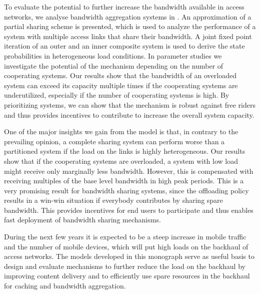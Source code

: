 To evaluate the potential to further increase the bandwidth available in access networks, we analyse bandwidth aggregation systems in .
An approximation of a partial sharing scheme is presented, which is used to analyze the performance of a system with multiple access links that share their bandwidth.
A joint fixed point iteration of an outer and an inner composite system is used to derive the state probabilities in heterogeneous load conditions.
In parameter studies we investigate the potential of the mechanism depending on the number of cooperating systems.
Our results show that the bandwidth of an overloaded system can exceed its capacity multiple times if the cooperating systems are underutilized, especially if the number of cooperating systems is high.
By prioritizing systems, we can show that the mechanism is robust against free riders and thus provides incentives to contribute to increase the overall system capacity.

One of the major insights we gain from the model is that, in contrary to the prevailing opinion, a complete sharing system can perform worse than a partitioned system if the load on the links is highly heterogeneous.
Our results show that if the cooperating systems are overloaded, a system with low load might receive only marginally less bandwidth.
However, this is compensated with receiving multiples of the base level bandwidth in high peak periods.
This is a very promising result for bandwidth sharing systems, since the offloading policy results in a win-win situation if everybody contributes by sharing spare bandwidth.
This provides incentives for end users to participate and thus enables fast deployment of bandwidth sharing mechanisms.

During the next few years it is expected to be a steep increase in mobile traffic and the number of mobile devices, which will put high loads on the backhaul of access networks.
The models developed in this monograph serve as useful basis to design and evaluate mechanisms to further reduce the load on the backhaul by improving content delivery and to efficiently use spare resources in the backhaul for caching and bandwidth aggregation.
